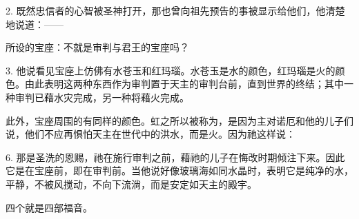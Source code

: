 2.  既然忠信者的心智被圣神打开，那也曾向祖先预告的事被显示给他们，他清楚地说道：——\par

 所设的宝座：不就是审判与君王的宝座吗？\par

3.  他说看见宝座上仿佛有水苍玉和红玛瑙。水苍玉是水的颜色，红玛瑙是火的颜色。由此表明这两种东西作为审判置于天主的审判台前，直到世界的终结；其中一种审判已藉水灾完成，另一种将藉火完成。\par

 此外，宝座周围的有同样的颜色。虹之所以被称为，是因为主对诺厄和他的儿子们说，他们不应再惧怕天主在世代中的洪水，而是火。因为祂这样说：\par

6.  那是圣洗的恩赐，祂在施行审判之前，藉祂的儿子在悔改时期倾注下来。因此它是在宝座前，即在审判前。当他说好像玻璃海如同水晶时，表明它是纯净的水，平静，不被风搅动，不向下流淌，而是安定如天主的殿宇。\par

 四个就是四部福音。\par

